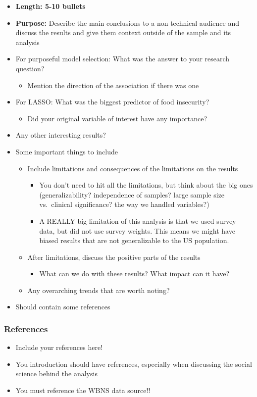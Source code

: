 \documentclass[
  letterpaper,
  DIV=11,
  numbers=noendperiod]{scrartcl}
\providecommand{\tightlist}{%
  \setlength{\itemsep}{0pt}\setlength{\parskip}{0pt}}
\begin{document}
\begin{itemize}
\tightlist
\item
  \textbf{Length: 5-10 bullets}
\item
  \textbf{Purpose:} Describe the main conclusions to a non-technical
  audience and discuss the results and give them context outside of the
  sample and its analysis
\item
  {For purposeful model selection:} What was the answer to your research
  question?

  \begin{itemize}
  \tightlist
  \item
    Mention the direction of the association if there was one
  \end{itemize}
\item
  {For LASSO:} What was the biggest predictor of food insecurity?

  \begin{itemize}
  \tightlist
  \item
    Did your original variable of interest have any importance?
  \end{itemize}
\item
  Any other interesting results?
\item
  Some important things to include

  \begin{itemize}
  \tightlist
  \item
    Include limitations and consequences of the limitations on the
    results

    \begin{itemize}
    \tightlist
    \item
      You don't need to hit all the limitations, but think about the big
      ones (generalizability? independence of samples? large sample size
      vs.~clinical significance? the way we handled variables?)
    \item
      A REALLY big limitation of this analysis is that we used survey
      data, but did not use survey weights. This means we might have
      biased results that are not generalizable to the US population.
    \end{itemize}
  \item
    After limitations, discuss the positive parts of the results

    \begin{itemize}
    \tightlist
    \item
      What can we do with these results? What impact can it have?
    \end{itemize}
  \item
    Any overarching trends that are worth noting?
  \end{itemize}
\item
  Should contain some references
\end{itemize}

\subsubsection{References}\label{references}

\begin{itemize}
\tightlist
\item
  Include your references here!
\item
  You introduction should have references, especially when discussing
  the social science behind the analysis
\item
  You must reference the WBNS data source!!
\end{itemize}
\end{document}

